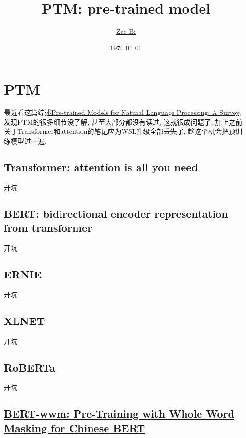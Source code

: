 \documentclass{article}
\begin{document}
\begin{titlepage}
    \title{PTM: pre-trained model}
    \author{\href{https://github.com/ZacBi}{Zac Bi}}
    \date{\today}
    \maketitle
    \pagestyle{empty}
\end{titlepage}

\section{PTM}

最近看这篇综述\href{http://arxiv.org/abs/2003.08271}{Pre-trained Models for Natural Language Processing: A Survey}, 发现PTM的很多细节没了解, 甚至大部分都没有读过,
这就很成问题了, 加上之前关于Transformer和attention的笔记应为WSL升级全部丢失了, 趁这个机会把预训练模型过一遍.

\subsection{Transformer: attention is all you need}

开坑

\subsection{BERT: bidirectional encoder representation from transformer}

开坑

\subsection{ERNIE}

开坑

\subsection{XLNET}

开坑

\subsection{RoBERTa}

开坑

\subsection{\href{https://arxiv.org/abs/1906.08101}{BERT-wwm: Pre-Training with Whole Word Masking for Chinese BERT}}
\end{document}
